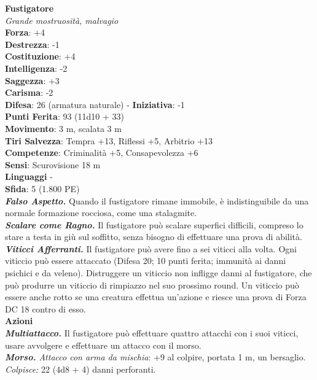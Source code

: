 \begin{multicols}{2}
\medskip\textbf{Fustigatore}\\
\emph{Grande mostruosità, malvagio}\\
\textbf{Forza}: +4\\
\textbf{Destrezza}: -1\\
\textbf{Costituzione}: +4\\
\textbf{Intelligenza}: -2\\
\textbf{Saggezza}: +3\\
\textbf{Carisma}: -2\\
\textbf{Difesa}: 26 (armatura naturale) - \textbf{Iniziativa}: -1\\
\textbf{Punti Ferita}: 93 (11d10 + 33)\\
\textbf{Movimento}: 3 m, scalata 3 m\\
\textbf{Tiri Salvezza}: Tempra +13, Riflessi +5, Arbitrio +13\\
\textbf{Competenze}: Criminalità +5, Consapevolezza +6\\
\textbf{Sensi}: Scurovisione 18 m\\
\textbf{Linguaggi} -\\
\textbf{Sfida}: 5 (1.800 PE)\smallskip\\
\emph{\textbf{Falso Aspetto.}} Quando il fustigatore rimane immobile, è indistinguibile da una normale formazione rocciosa, come una stalagmite.\\
\emph{\textbf{Scalare come Ragno.}} Il fustigatore può scalare superfici difficili, compreso lo stare a testa in giù sul soffitto, senza bisogno di effettuare una prova di abilità.\\
\emph{\textbf{Viticci Afferranti.}} Il fustigatore può avere fino a sei viticci alla volta. Ogni viticcio può essere attaccato (Difesa 20; 10 punti ferita; immunità ai danni psichici e da veleno). Distruggere un viticcio non infligge danni al fustigatore, che può produrre un viticcio di rimpiazzo nel suo prossimo round. Un viticcio può essere anche rotto se una creatura effettua un'azione e riesce una prova di Forza DC  18 contro di esso.\\
\smallskip\textbf{Azioni}\\
\emph{\textbf{Multiattacco.}} Il fustigatore può effettuare quattro attacchi con i suoi viticci, usare avvolgere e effettuare un attacco con il morso.\\
\emph{\textbf{Morso.} Attacco con arma da mischia}: +9 al colpire, portata 1 m, un bersaglio.\\
\emph{Colpisce:} 22 (4d8 + 4) danni perforanti.\\

\end{multicols}
